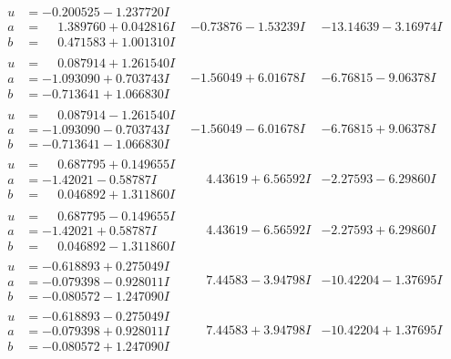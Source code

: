 \documentclass[1p]{elsarticle_modified}
\theoremstyle{definition}
\begin{document}
$$\begin{array}{c|c|c}
\begin{aligned}
u &= -0.200525 - 1.237720 I \\
a &= \phantom{-}1.389760 + 0.042816 I \\
b &= \phantom{-}0.471583 + 1.001310 I\end{aligned}
 & -0.73876 - 1.53239 I & -13.14639 - 3.16974 I \\ \hline\begin{aligned}
u &= \phantom{-}0.087914 + 1.261540 I \\
a &= -1.093090 + 0.703743 I \\
b &= -0.713641 + 1.066830 I\end{aligned}
 & -1.56049 + 6.01678 I & -6.76815 - 9.06378 I \\ \hline\begin{aligned}
u &= \phantom{-}0.087914 - 1.261540 I \\
a &= -1.093090 - 0.703743 I \\
b &= -0.713641 - 1.066830 I\end{aligned}
 & -1.56049 - 6.01678 I & -6.76815 + 9.06378 I \\ \hline\begin{aligned}
u &= \phantom{-}0.687795 + 0.149655 I \\
a &= -1.42021 - 0.58787 I \\
b &= \phantom{-}0.046892 + 1.311860 I\end{aligned}
 & \phantom{-}4.43619 + 6.56592 I & -2.27593 - 6.29860 I \\ \hline\begin{aligned}
u &= \phantom{-}0.687795 - 0.149655 I \\
a &= -1.42021 + 0.58787 I \\
b &= \phantom{-}0.046892 - 1.311860 I\end{aligned}
 & \phantom{-}4.43619 - 6.56592 I & -2.27593 + 6.29860 I \\ \hline\begin{aligned}
u &= -0.618893 + 0.275049 I \\
a &= -0.079398 - 0.928011 I \\
b &= -0.080572 - 1.247090 I\end{aligned}
 & \phantom{-}7.44583 - 3.94798 I & -10.42204 - 1.37695 I \\ \hline\begin{aligned}
u &= -0.618893 - 0.275049 I \\
a &= -0.079398 + 0.928011 I \\
b &= -0.080572 + 1.247090 I\end{aligned}
 & \phantom{-}7.44583 + 3.94798 I & -10.42204 + 1.37695 I \\ \hline\begin{aligned}

\end{aligned}
\end{array}$$
\end{document}
